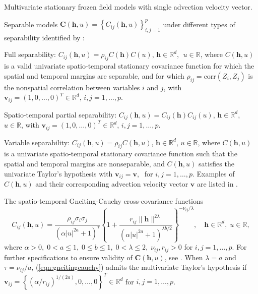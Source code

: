 \documentclass[12pt]{article}
\newcommand{\0}{\mathbf{0}}
\begin{document}
\begin{compactenum}
\item Multivariate stationary frozen field models with single advection velocity vector.

\item Separable models $\mathbf{C}(\mathbf{h},u)=\left\{C_{ij}(\mathbf{h},u)\right\}_{i,j=1}^{p}$ under different types of separability identified by \citet{apanasovich2010cross}: 
\begin{compactenum}
\item Full separability:
$C_{ij}(\mathbf{h},u)=\rho_{ij}C(\mathbf{h})C(u)$, $\mathbf{h}\in \mathbb{R}^d$, $\;u\in \mathbb{R}$,
where $C(\mathbf{h},u)$ is a valid univariate spatio-temporal stationary covariance function for which the spatial and temporal margins are separable, and for which $\rho_{ij}=\text{corr}(Z_i,Z_j)$ is the nonspatial correlation between variables $i$ and $j$, with $\mathbf{v}_{ij}=(1,0,\ldots,0)^T \in \mathbb{R}^d$, $i,j=1,\ldots,p$. 
\item Spatio-temporal partial separability:
$C_{ij}(\mathbf{h},u)=C_{ij}(\mathbf{h})C_{ij}(u)$, $\mathbf{h}\in \mathbb{R}^d$, $u\in \mathbb{R}$,
with $\mathbf{v}_{ij}=(1,0,\ldots,0)^T \in \mathbb{R}^d$, $i,j=1,\ldots,p$. 
\item Variable separability:
$C_{ij}(\mathbf{h},u)=\rho_{ij}C(\mathbf{h},u)$, $\mathbf{h}\in \mathbb{R}^d$, $u\in \mathbb{R}$,
where $C(\mathbf{h},u)$ is a univariate spatio-temporal stationary covariance function such that the spatial and temporal margins are nonseparable, and $C(\mathbf{h},u)$ satisfies the univariate Taylor's hypothesis with $\mathbf{v}_{ij}=\mathbf{v},\;$ for $i,j=1,\ldots,p$. Examples of $C(\mathbf{h},u)$ and their corresponding advection velocity vector $\mathbf{v}$ are listed in \citet{gneiting2006geostatistical}.
\end{compactenum}

\item The spatio-temporal Gneiting-Cauchy cross-covariance functions 
\begin{equation}\label{eqn:gneitingcauchy}
C_{ij}(\mathbf{h},u)=\frac{\rho_{ij}\sigma_{i}\sigma_{j}}{(\alpha |u|^{2a}+1)^{\tau}}\left\{1+\frac{r_{ij}\|\mathbf{h}\|^{2\lambda}}{(\alpha|u|^{2a}+1)^{\lambda b/2}}\right\}^{-\nu_{ij}/\lambda},\quad \mathbf{h}\in \mathbb{R}^d,\;u\in \mathbb{R},
\end{equation}
where $\alpha>0,\;0<a\leq 1,\;0\leq b\leq 1,\;0<\lambda\leq 2,\;\nu_{ij},r_{ij}>0$ for $i,j=1,\ldots,p$. For further specifications to ensure validity of $\mathbf{C}(\mathbf{h},u)$, see \citet{bourotte2016flexible}. When $\lambda=a$ and $\tau=\nu_{ij}/a$, (\ref{eqn:gneitingcauchy}) admits the multivariate Taylor's hypothesis if $\mathbf{v}_{ij}=\left\{(\alpha/r_{ij})^{1/(2a)},0,\ldots,0\right\}^T\in \mathbb{R}^d$ for $i,j=1,\ldots,p$.
\end{compactenum}
\end{document}
